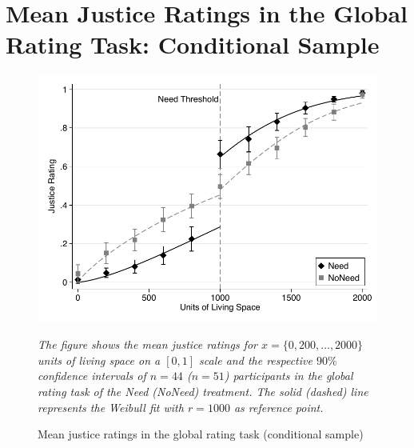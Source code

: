 \documentclass[12pt]{scrartcl}
\begin{document}
\clearpage
\section{Mean Justice Ratings in the Global Rating Task: Conditional Sample}\label{sec:app_conditional_absolute}
\begin{figure}[ht!]
   \centering
   \includegraphics{figures/figure_13.pdf}
   \begin{minipage}{\linewidth}
      \footnotesize
      \textit{The figure shows the mean justice ratings for $x=\{0,200,\ldots,2000\}$ units of living space on a $[0,1]$ scale and the respective $90\%$ confidence intervals of $n=44$ ($n=51$) participants in the global rating task of the Need (NoNeed) treatment. The solid (dashed) line represents the Weibull fit with $r=1000$ as reference point.}
   \end{minipage}
   \caption{Mean justice ratings in the global rating task (conditional sample)}
   \label{fig:figure_13}
\end{figure}
\end{document}
